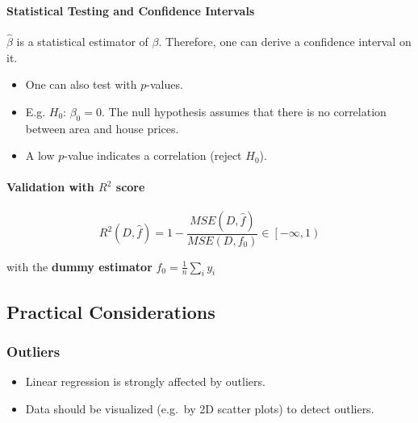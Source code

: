 
\paragraph{Statistical Testing and Confidence Intervals}


$\widehat{\beta}$ is a statistical estimator of $\beta$. Therefore, one can derive a confidence interval on it.


\begin{itemize}
    \item One can also test with $p$-values.
    \item E.g. $H_0$: $\beta_0=0$. The null hypothesis assumes that there is no correlation between area and house prices.
    \item A low $p$-value indicates a correlation (reject $H_0$).
\end{itemize}

\paragraph[Validation with R2]{Validation with $R^2$ score}
\noindent\begin{equation*}
    R^2(D,\widehat{f})=1-\frac{MSE(D,\widehat{f})}{MSE(D,f_0)}\in\left[-\infty,1\right) %
\end{equation*}

with the \textbf{dummy estimator}
$ f_0=\frac1n\sum_{i}{y_i}$

\subsection{Practical Considerations}

\subsubsection{Outliers}
\begin{itemize}
    \item Linear regression is strongly affected by outliers.
    \item Data should be visualized (e.g.\ by 2D scatter plots) to detect outliers.
\end{itemize}


